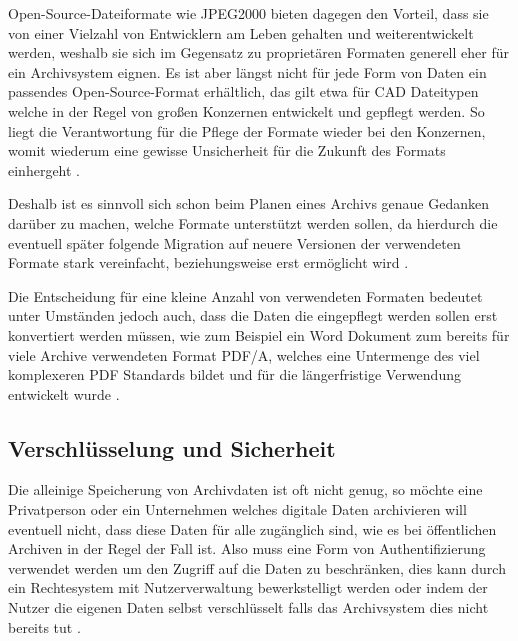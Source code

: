 \documentclass[conference,compsoc,final,a4paper]{IEEEtran}
\begin{document}
Open-Source-Dateiformate wie JPEG2000 bieten dagegen den Vorteil, dass sie von einer Vielzahl von Entwicklern am Leben gehalten und weiterentwickelt werden, weshalb sie sich im Gegensatz zu proprietären Formaten generell eher für ein Archivsystem eignen. Es ist aber längst nicht für jede Form von Daten ein passendes Open-Source-Format erhältlich, das gilt etwa für \ac{CAD} Dateitypen welche in der Regel von großen Konzernen entwickelt und gepflegt werden. So liegt die Verantwortung für die Pflege der Formate wieder bei den Konzernen, womit wiederum eine gewisse Unsicherheit für die Zukunft des Formats einhergeht \autocite{dpcFormatsStandards}. 

Deshalb ist es sinnvoll sich schon beim Planen eines Archivs genaue Gedanken darüber zu machen, welche Formate unterstützt werden sollen, da hierdurch die eventuell später folgende Migration auf neuere Versionen der verwendeten Formate stark vereinfacht, beziehungsweise erst ermöglicht wird \autocite{dpcFormatsStandards}.

Die Entscheidung für eine kleine Anzahl von verwendeten Formaten bedeutet unter Umständen jedoch auch, dass die Daten die eingepflegt werden sollen erst konvertiert werden müssen, wie zum Beispiel ein Word Dokument zum bereits für viele Archive verwendeten Format \acs{PDF}/A, welches eine Untermenge des viel komplexeren \acs{PDF} Standards bildet und für die längerfristige Verwendung entwickelt wurde \autocite{Strodl2007}.

\subsection{Verschlüsselung und Sicherheit}
Die alleinige Speicherung von Archivdaten ist oft nicht genug, so möchte eine Privatperson oder ein Unternehmen welches digitale Daten archivieren will eventuell nicht, dass diese Daten für alle zugänglich sind, wie es bei öffentlichen Archiven in der Regel der Fall ist. Also muss eine Form von Authentifizierung verwendet werden um den Zugriff auf die Daten zu beschränken, dies kann durch ein Rechtesystem mit Nutzerverwaltung bewerkstelligt werden oder indem der Nutzer die eigenen Daten selbst verschlüsselt falls das Archivsystem dies nicht bereits tut \autocite{Storer2006}.
\end{document}
